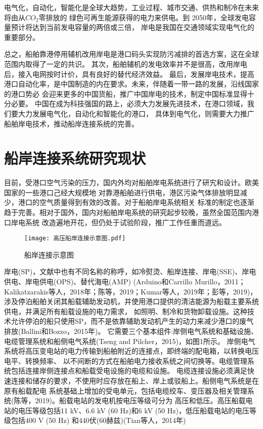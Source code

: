 电气化，自动化，智能化是全球大趋势，工业过程、城市交通、供热和制冷在未来将由从$CO_{2}$零排放的
绿色可再生能源获得的电力来供电。到 2050年，全球发电容量预计将达到当前发电容量的两倍或三倍，
岸电是我国在交通领域实现电气化的重要部分。

总之，船舶靠港停用辅机改用岸电是港口码头实现防污减排的首选方案，这在全球范围内取得了一定的共识。
其次，船舶辅机的发电效率并不是很高，改用岸电后，接入电网按时计价，具有良好的替代经济效益。
最后，发展岸电技术，提高港口自动化率，是中国制造的内在要求。未来，伴随着一带一路的发展，沿线国家的港口势必
会迎来更多的中国货船，推广中国岸电的技术，制定中国标准显得十分必要。
中国在成为科技强国的路上，必须大力发展先进技术，在港口领域，我们要大力发展电气化，自动化和智能化的港口，
具体到电气化，则需要大力推广船舶岸电技术，推动船岸连接系统的完善。


\section{船岸连接系统研究现状}
目前，受港口空气污染的压力，国内外均对船舶岸电系统进行了研宄和设计。欧美国家的一些港口己经大规模地
对靠港船舶进行供电，港区污染气体排放明显减少，港口的空气质量得到有效的改善。对于船舶岸电系统相关
标准的制定也逐渐趋于完善。相对于国外，国内对船舶岸电系统的研究起步较晚，虽然全国范围内港口岸电系统
改造遍地开花，但仍处于试验阶段，推广工作任重而道远。


\begin{figure}[!htp]
	\centering
	\texttt{[image: 高压船岸连接示意图.pdf]}
	\caption{船岸连接示意图}
	\label{fig:船岸连接示意图}
\end{figure}



岸电(SP)，文献中也有不同名称的称呼，如冷熨烫、船岸连接、岸电(SSE)、岸电供电、岸电供电(OPS)、替代海电(AMP) 
(Arduino和Carrillo Murillo，2011；Kalikatzarakis等人，2018年；陈等，2019；Kumar等人，2019年；彭等，2019)，
涉及停泊船舶关闭其船载辅助发动机，并使用港口提供的清洁能源为船载主要系统供电，并满足所有船载设施的电力需求，
如照明、制冷和货物卸载设施。这种技术允许停泊的船只使用SP，而不是依靠辅助发动机产生的动力来减少港口的废气排放(Ballini和Bozzo，2015年)。
它需要三个基本组件:岸侧电气系统和基础设施、电缆管理系统和船侧电气系统(Tseng and Pilcher，2015)，如图1所示。
岸侧电气系统将高压变电站的电力传输到船舶附近的连接点，即终端的配电箱，以转换电压电平、转换频率、
以不间断的方式在船舶电力接收系统之间切换等。电缆管理系统包括连接岸侧连接点和船载受电设施的电缆和设施。
电缆连接设施必须满足快速连接和储存的要求，不使用时应存放在船上、岸上或驳船上。船侧电气系统是在原有船载配电
系统基础上增加的受电单元，包括电缆绞车、变压器及相关管理系统(陈等，2019)。船载电站的发电机按电压等级可分为
高压和低压。高压船载电站的电压等级包括11 kV、6.6 kV (60 Hz)和6 kV (50 Hz)，低压船载电站的电压等级包括400 V (50 Hz)
和440伏(60赫兹)(Tian等人，2014年)

